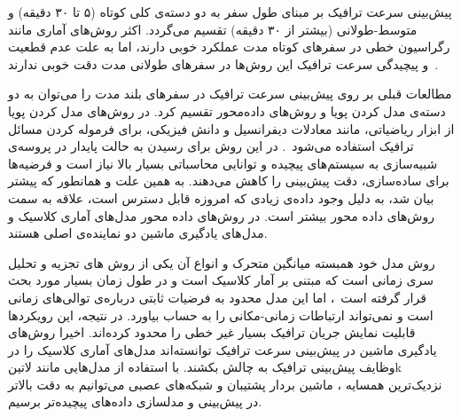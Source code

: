 
پیش‌بینی سرعت ترافیک بر مبنای طول سفر به دو دسته‌ی کلی کوتاه (۵ تا ۳۰ دقیقه) و متوسط-طولانی (بیشتر از ۳۰ دقیقه) تقسیم می‌گردد.
اکثر روش‌های آماری مانند رگراسیون خطی در سفرهای کوتاه مدت عملکرد خوبی دارند، اما به علت عدم قطعیت و پیچیدگی سرعت ترافیک این روش‌ها در سفرهای طولانی مدت دقت خوبی ندارند~.

مطالعات قبلی بر روی پیش‌بینی سرعت ترافیک در سفرهای بلند مدت را می‌توان به دو دسته‌ی مدل کردن پویا و روش‌های داده‌محور تقسیم کرد.
در روش‌های مدل کردن پویا از ابزار ریاضیاتی، مانند معادلات دیفرانسیل و دانش فیزیکی، برای فرموله کردن مسائل ترافیک استفاده می‌شود~.
در این روش برای رسیدن به حالت پایدار در پروسه‌ی شبیه‌سازی به سیستم‌های پیچیده و توانایی محاسباتی بسیار بالا نیاز است و فرضیه‌ها برای ساده‌سازی، دقت پیش‌بینی را کاهش می‌دهند.
به همین علت و همانطور که پیشتر بیان شد، به دلیل وجود داده‌ی زیادی که امروزه قابل دسترس است، علاقه به سمت روش‌های داده محور بیشتر است.
در روش‌های داده محور مدل‌های آماری کلاسیک و مدل‌های یادگیری ماشین دو نماینده‌ی اصلی هستند.

روش مدل خود همبسته میانگین متحرک و انواع آن یکی از روش های تجزیه و تحلیل سری زمانی است که مبتنی بر آمار کلاسیک است
و در طول زمان بسیار مورد بحث قرار گرفته است~،
اما این مدل محدود به فرضیات ثابتی درباره‌ی توالی‌های زمانی است و نمی‌تواند ارتباطات زمانی-مکانی را به حساب بیاورد. در نتیجه، این رویکردها قابلیت نمایش جریان ترافیک بسیار غیر خطی را محدود کرده‌اند.
اخیرا روش‌های یادگیری ماشین در پیش‌بینی سرعت ترافیک توانسته‌اند مدل‌های آماری کلاسیک را در وظایف پیش‌بینی ترافیک به چالش بکشند. با استفاده از مدل‌هایی مانند ‌لاتین{k} نزدیک‌ترین همسایه ، ماشین بردار پشتیبان  و شبکه‌های عصبی  می‌توانیم به دقت بالاتر در پیش‌بینی و مدلسازی داده‌های پیچیده‌تر برسیم.


